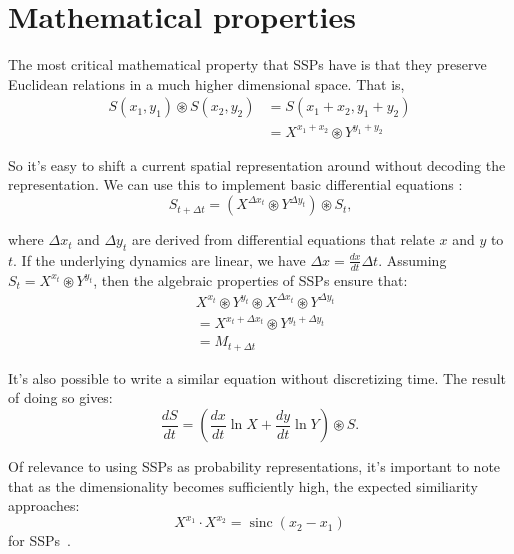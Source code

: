 \documentclass[10pt,letterpaper,oneside]{article}
\newcommand{\sinc}[1]{\operatorname{sinc}\left({#1}\right)}
\begin{document}
\section{Mathematical properties}

The most critical mathematical property that SSPs have is that they preserve Euclidean relations in a much higher dimensional space. That is, 
\begin{align}
   S(x_1,y_1) \circledast S(x_2,y_2) 
   &= S(x_1 + x_2,y_1 + y_2) \\
   &= X^{x_1 + x_2} \circledast Y^{y_1 + y_2}
\end{align}

So it's easy to shift a current spatial representation around without decoding the representation. We can use this to implement basic differential equations \cite{voelker2021a}:
\begin{equation} \label{eq:discrete-binding}
  S_{t + \Delta t} = \left ( X^{\Delta x_t} \circledast Y^{\Delta y_t} \right ) \circledast S_{t}  \text{,}
\end{equation}

where $\Delta x_t$ and $\Delta y_t$ are derived from differential equations that relate $x$ and $y$ to $t$. If the underlying dynamics are linear, we have $\Delta x = \frac{dx}{dt}\Delta t$. Assuming $ S_{t}=X^{x_t} \circledast Y^{y_t}$, then the algebraic properties of SSPs ensure that: 
\begin{align}
  & X^{x_t} \circledast Y^{y_t} \circledast X^{\Delta x_t} \circledast Y^{\Delta y_t} \\
  &= X^{x_t + \Delta x_t} \circledast Y^{y_t + \Delta y_t} \\
  &=  M_{t + \Delta t}
\end{align}

It's also possible to write a similar equation without discretizing time. The result of doing so gives: 
\begin{equation} \label{eq:continuous-binding}
  \frac{d S }{dt} = \left( \frac{dx}{dt} \ln X + \frac{dy}{dt} \ln Y \right) \circledast S \text{.}
 \end{equation}

Of relevance to using SSPs as probability representations, it's important to note that as the dimensionality becomes sufficiently high, the expected similiarity approaches:
\begin{equation}
X^{x_1} \cdot X^{x_2} = \sinc{x_2 - x_1}
\end{equation}
for SSPs~\cite{voelker2020short}.
\end{document}
